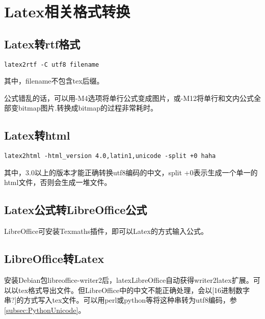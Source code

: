 
\section{Latex相关格式转换}
\subsection{Latex转rtf格式}
\begin{verbatim}
latex2rtf -C utf8 filename
\end{verbatim}
其中，filename不包含tex后缀。

公式错乱的话，可以用-M4选项将单行公式变成图片，或-M12将单行和文内公式全部变bitmap图片.转换成bitmap的过程非常耗时。

\subsection{Latex转html}
\begin{verbatim}
latex2html -html_version 4.0,latin1,unicode -split +0 haha
\end{verbatim}
其中，3.0以上的版本才能正确转换utf8编码的中文，split +0表示生成一个单一的html文件，否则会生成一堆文件。

\subsection{Latex公式转LibreOffice公式}
LibreOffice可安装Texmaths插件，即可以Latex的方式输入公式。


\subsection{LibreOffice转Latex}
安装Debian包libreoffice-writer2后，latexLibreOffice自动获得writer2latex扩展。可以以tex格式导出文件。但LibreOffice中的中文不能正确处理，会以[16进制数字串?]的方式写入tex文件。可以用perl或python等将这种串转为utf8编码，参\ref{subsec:PythonUnicode}。


